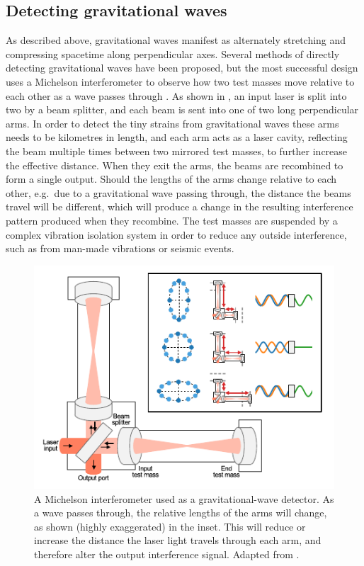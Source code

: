 \subsection{Detecting gravitational waves}
\label{sec:gw_detecting}
\begin{colsection}

As described above, gravitational waves manifest as alternately stretching and compressing spacetime along perpendicular axes. Several methods of directly detecting gravitational waves have been proposed, but the most successful design uses a Michelson interferometer to observe how two test masses move relative to each other as a wave passes through \citep{BIGbirmingham}. As shown in , an input laser is split into two by a beam splitter, and each beam is sent into one of two long perpendicular arms. In order to detect the tiny strains from gravitational waves these arms needs to be kilometres in length, and each arm acts as a laser cavity, reflecting the beam multiple times between two mirrored test masses, to further increase the effective distance. When they exit the arms, the beams are recombined to form a single output. Should the lengths of the arms change relative to each other, e.g.\ due to a gravitational wave passing through, the distance the beams travel will be different, which will produce a change in the resulting interference pattern produced when they recombine. The test masses are suspended by a complex vibration isolation system in order to reduce any outside interference, such as from man-made vibrations or seismic events.

\begin{figure}[t]
    \begin{center}
        \includegraphics[width=0.75\linewidth]{images/detector.pdf}
    \end{center}
    \caption[A Michelson interferometer used as a gravitational-wave detector]{
        A Michelson interferometer used as a gravitational-wave detector. As a wave passes through, the relative lengths of the arms will change, as shown (highly exaggerated) in the inset. This will reduce or increase the distance the laser light travels through each arm, and therefore alter the output interference signal. Adapted from \citet{GW150914_detectors}.
        }\label{fig:detector}
\end{figure}


\end{colsection}
